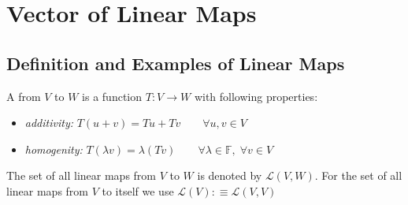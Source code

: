 \section{Vector of Linear Maps}

\subsection{Definition and Examples of Linear Maps}

\begin{mydef} 
  A \lm from $V$ to $W$ is a function $T:V\to W$ with following properties:
  \begin{itemize}
    \item \emph{additivity:} $T(u+v)=Tu + Tv \qquad \forall u,v \in V$
    \item \emph{homogenity:} $T(\lambda v)=\lambda (Tv) \qquad
    \forall \lambda \in \mathbb{F}, \; \forall v\in V$
  \end{itemize}
\end{mydef}

\begin{mydef} 
  The set of all linear maps from $V$ to $W$ is denoted by $\mathcal{L}(V,W)$. For the set of all linear maps from $V$ to itself we use $\mathcal{L}(V) :\equiv \mathcal{L}(V,V)$
\end{mydef}

